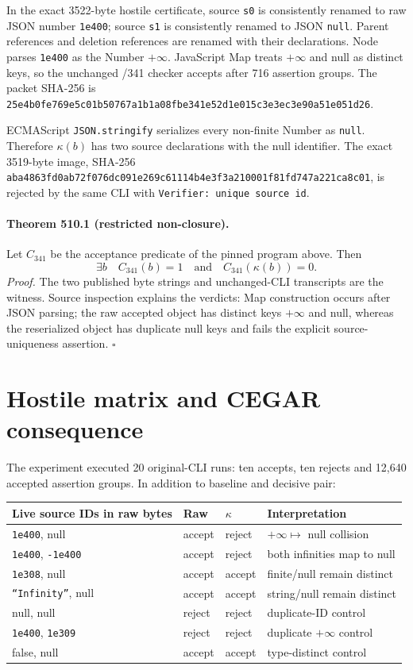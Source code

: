 \documentclass[11pt]{article}
\begin{document}
In the exact 3522-byte hostile certificate, source \texttt{s0} is consistently
renamed to raw JSON number \texttt{1e400}; source \texttt{s1} is consistently
renamed to JSON \texttt{null}.  Parent references and deletion references are
renamed with their declarations.  Node parses \texttt{1e400} as the Number
$+\infty$.  JavaScript Map treats $+\infty$ and null as distinct keys, so the
unchanged /341 checker accepts after 716 assertion groups.  The packet SHA-256 is
\texttt{25e4b0fe769e5c01b50767a1b1a08fbe341e52d1e015c3e3ec3e90a51e051d26}.

ECMAScript \texttt{JSON.stringify} serializes every non-finite Number as
\texttt{null}.  Therefore $\kappa(b)$ has two source declarations with the null
identifier.  The exact 3519-byte image, SHA-256
\texttt{aba4863fd0ab72f076dc091e269c61114b4e3f3a210001f81fd747a221ca8c01},
is rejected by the same CLI with \texttt{Verifier: unique source id}.

\paragraph{Theorem 510.1 (restricted non-closure).}
Let $C_{341}$ be the acceptance predicate of the pinned program above.  Then
\[
  \exists b\quad C_{341}(b)=1\quad\text{and}\quad C_{341}(\kappa(b))=0.
\]
\emph{Proof.}  The two published byte strings and unchanged-CLI transcripts are
the witness.  Source inspection explains the verdicts: Map construction occurs
after JSON parsing; the raw accepted object has distinct keys $+\infty$ and
null, whereas the reserialized object has duplicate null keys and fails the
explicit source-uniqueness assertion. \(\square\)

\section{Hostile matrix and CEGAR consequence}
The experiment executed 20 original-CLI runs: ten accepts, ten rejects and
12,640 accepted assertion groups.  In addition to baseline and decisive pair:

\begin{center}
\begin{tabular}{@{}llll@{}}
\toprule
Live source IDs in raw bytes & Raw & $\kappa$ & Interpretation\\
\midrule
\texttt{1e400}, null & accept & reject & $+\infty\mapsto$ null collision\\
\texttt{1e400}, \texttt{-1e400} & accept & reject & both infinities map to null\\
\texttt{1e308}, null & accept & accept & finite/null remain distinct\\
\texttt{``Infinity''}, null & accept & accept & string/null remain distinct\\
null, null & reject & reject & duplicate-ID control\\
\texttt{1e400}, \texttt{1e309} & reject & reject & duplicate $+\infty$ control\\
false, null & accept & accept & type-distinct control\\
\bottomrule
\end{tabular}
\end{center}
\end{document}
